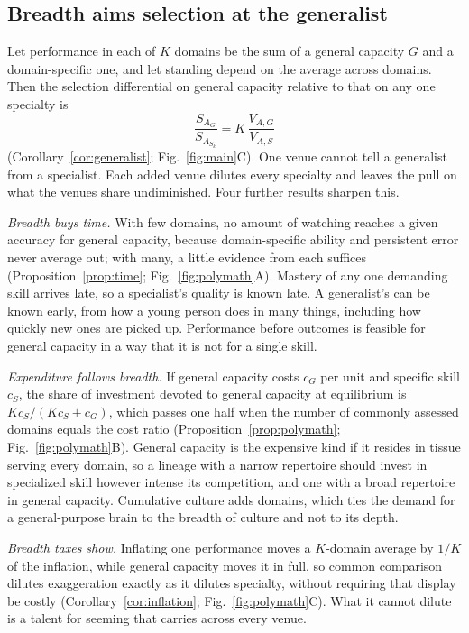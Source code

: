 \subsection{Breadth aims selection at the generalist}\label{sec:resgeneralist}

Let performance in each of $K$ domains be the sum of a general capacity $G$ and a domain-specific one, and let standing
depend on the average across domains. Then the selection differential on general capacity relative to that on any one
specialty is
\begin{equation}
\frac{S_{A_G}}{S_{A_{S_k}}}=K\,\frac{V_{A,G}}{V_{A,S}}\label{eq:mainaim}
\end{equation}
(Corollary~\ref{cor:generalist}; Fig.~\ref{fig:main}C). One venue cannot tell a generalist from a specialist. Each added venue
dilutes every specialty and leaves the pull on what the venues share undiminished. Four further results sharpen this.

\emph{Breadth buys time.} With few domains, no amount of watching reaches a given accuracy for general capacity, because
domain-specific ability and persistent error never average out; with many, a little evidence from each suffices
(Proposition~\ref{prop:time}; Fig.~\ref{fig:polymath}A). Mastery of any one demanding skill arrives late, so a specialist's
quality is known late. A generalist's can be known early, from how a young person does in many things, including how
quickly new ones are picked up. Performance before outcomes is feasible for general capacity in a way that it is not for a
single skill.

\emph{Expenditure follows breadth.} If general capacity costs $c_G$ per unit and specific skill $c_S$, the share of
investment devoted to general capacity at equilibrium is $Kc_S/(Kc_S+c_G)$, which passes one half when the number of commonly
assessed domains equals the cost ratio (Proposition~\ref{prop:polymath}; Fig.~\ref{fig:polymath}B). General capacity is the
expensive kind if it resides in tissue serving every domain, so a lineage with a narrow repertoire should invest in
specialized skill however intense its competition, and one with a broad repertoire in general capacity. Cumulative culture
adds domains, which ties the demand for a general-purpose brain to the breadth of culture and not to its depth.

\emph{Breadth taxes show.} Inflating one performance moves a $K$-domain average by $1/K$ of the inflation, while general
capacity moves it in full, so common comparison dilutes exaggeration exactly as it dilutes specialty, without requiring
that display be costly (Corollary~\ref{cor:inflation}; Fig.~\ref{fig:polymath}C). What it cannot dilute is a talent for
seeming that carries across every venue.


